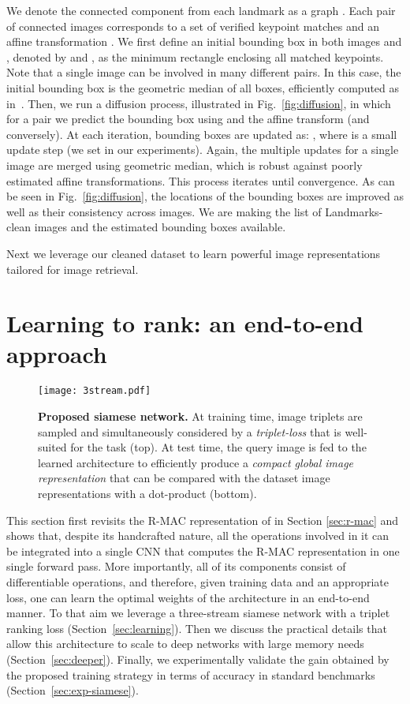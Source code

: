 \documentclass[twocolumn]{svjour3}          \smartqed  \usepackage{graphicx}
\begin{document}
{We denote the connected component from each landmark as a graph .  Each pair of connected images
 corresponds to a set of verified keypoint matches and an affine
transformation .  We first define an initial bounding box in both images  and , denoted by  and
, as the minimum rectangle enclosing all matched keypoints. Note that a single image can be involved in many
different pairs. In this case, the initial bounding box is the geometric median of all boxes, efficiently computed
as in~\cite{GeoMedian2004}. Then, we run a diffusion process, illustrated in Fig.~\ref{fig:diffusion}, in which for a
pair  we predict the bounding box  using  and the affine transform  (and conversely).  At
each iteration, bounding boxes are updated as: , where  is a small
update step (we set  in our experiments). Again, the multiple updates for a single image are merged using
geometric median, which is robust against poorly estimated affine transformations.  This process iterates until
convergence. As can be seen in Fig.~\ref{fig:diffusion}, the locations of the bounding boxes are improved as well as 
their consistency across images.}
We are making the list of Landmarks-clean images and the estimated bounding boxes available. 

Next we leverage our cleaned dataset to learn powerful image representations tailored for image retrieval.

\section{Learning to rank: an end-to-end approach}
\label{sec:part1}

\begin{figure*}[t!]
\texttt{[image: 3stream.pdf]}
\caption{\textbf{Proposed siamese network.} At training time, image triplets are
sampled and simultaneously considered by a \textit{triplet-loss} that is well-suited for the task (top).
At test time, the query image is fed to the learned architecture to
efficiently produce a \textit{compact global image representation} that can be compared with the dataset image representations with a
dot-product (bottom). \label{fig:siamese}}
\end{figure*}

\label{sec:method}

This section first revisits the R-MAC representation of \cite{Tolias2016} in Section \ref{sec:r-mac} and shows that, despite its handcrafted nature, all the operations involved in it can be integrated into a single CNN that computes the R-MAC representation in one single forward pass. 
More importantly, all of its components consist of differentiable operations, and therefore, given training data and an appropriate loss, one can learn the optimal weights of the architecture in an end-to-end manner.
To that aim we leverage a three-stream siamese network with a triplet ranking loss (Section~\ref{sec:learning}).
Then we discuss the practical details that allow this architecture to scale to deep networks with large memory needs (Section~\ref{sec:deeper}).
Finally, we experimentally validate the gain obtained by the proposed training strategy in terms of accuracy in standard benchmarks (Section~\ref{sec:exp-siamese}).
\end{document}

